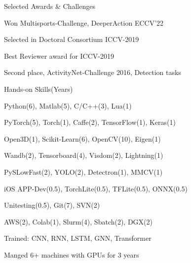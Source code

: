 \documentclass{resume} %
\begin{document}
\begin{multicols}{2}
\begin{mSection}{Selected Awards \& Challenges}{}
\begin{sSubsection}{Won Multisports-Challenge, DeeperAction ECCV'22}\end{sSubsection} %
\begin{sSubsection}{Selected in Doctoral Consortium ICCV-2019}\end{sSubsection}  %
\begin{sSubsection}{Best Reviewer award for ICCV-2019}\end{sSubsection} %
\begin{sSubsection}{Second place, ActivityNet-Challenge 2016, Detection tasks}\end{sSubsection} %
\end{mSection}

\begin{mSection}{Hands-on Skills}{(Years)} 
  \begin{sSubsection}{Python(6), Matlab(5), C/C++(3), Lua(1)}\end{sSubsection}
  \begin{sSubsection}{PyTorch(5), Torch(1), Caffe(2), TensorFlow(1), Keras(1)}\end{sSubsection}
  \begin{sSubsection}{Open3D(1), Scikit-Learn(6), OpenCV(10), Eigen(1)}\end{sSubsection}
  \begin{sSubsection}{Wandb(2), Tensorboard(4), Visdom(2), Lightning(1)}\end{sSubsection}
  \begin{sSubsection}{PySLowFast(2), YOLO(2), Detectron(1), MMCV(1)}\end{sSubsection}
  \begin{sSubsection}{iOS APP-Dev(0.5), TorchLite(0.5), TFLite(0.5), ONNX(0.5)}\end{sSubsection}
  \begin{sSubsection}{Unitesting(0.5), Git(7), SVN(2)}\end{sSubsection} %
  \begin{sSubsection}{AWS(2), Colab(1), Slurm(4), Sbatch(2), DGX(2)}\end{sSubsection}
  \begin{sSubsection}{Trained: CNN, RNN, LSTM, GNN, Transformer}\end{sSubsection}
  \begin{sSubsection}{Manged 6+ machines with GPUs for 3 years }\end{sSubsection}
\end{mSection}


\end{multicols}
\end{document}
